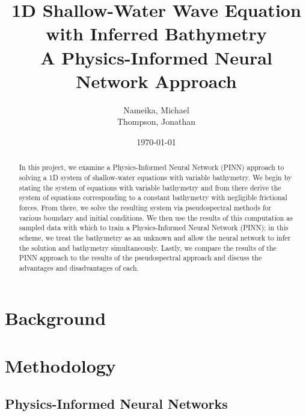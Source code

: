 \documentclass[letterpaper,11pt]{article}
\begin{document}
    \title{%
        1D Shallow-Water Wave Equation with Inferred Bathymetry\\
        \large A Physics-Informed Neural Network Approach
    }
    \author{%
        Nameika, Michael \\
        Thompson, Jonathan
    }
    \date{\today}
    \maketitle

    \begin{abstract}
        In this project, we examine a Physics-Informed Neural Network (PINN) approach to solving a 1D system of 
        shallow-water equations with variable bathymetry. We begin by stating the system of equations with variable
        bathymetry and from there derive the system of equations corresponding to a constant bathymetry with negligible
        frictional forces. From there, we solve the resulting system via pseudospectral methods for various boundary
        and initial conditions. We then use the results of this computation as sampled data with which to train a 
        Physics-Informed Neural Network (PINN); in this scheme, we treat the bathymetry as an unknown and allow the 
        neural network to infer the solution and bathymetry simultaneously. Lastly, we compare the results of the PINN
        approach to the results of the pseudospectral approach and discuss the advantages and disadvantages of each.
    \end{abstract}

    \section{Background}\label{sec:background}

    

    \section{Methodology}\label{sec:proposed-methodology}



    \subsection{Physics-Informed Neural Networks}\label{subsec:pinn-methodology}
\end{document}
